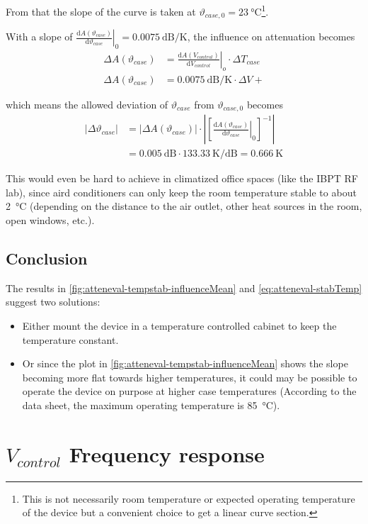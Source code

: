 






From that the slope of the curve is taken at $\vartheta_{case,0}=\SI{23}{\degreeCelsius}$\footnote{This is not necessarily room temperature or expected operating temperature of the device but a convenient choice to get a linear curve section.}.

With a slope of $\left.\frac{\text{d}A(\vartheta_{case})}{\text{d}\vartheta_{case}}\right|_{0} = \SI{0.0075}{\dB\per\kelvin}$, the influence on attenuation becomes
\begin{align}
\Delta A(\vartheta_{case}) &= \left.\frac{\text{d}A(V_{control})}{\text{d}V_{control}}\right|_{o} \cdot \Delta T_{case} \\
\Delta A(\vartheta_{case}) &= \SI{0.0075}{\dB\per\kelvin} \cdot \Delta V+
\end{align}

which means the allowed deviation of $\vartheta_{case}$ from $\vartheta_{case,0}$ becomes
\begin{align}\label{eq:atteneval-stabTemp}
\left|\Delta \vartheta_{case}\right| &= \left|\Delta A(\vartheta_{case})\right| \cdot 
\left|\left[\left.\frac{\text{d}A(\vartheta_{case})}{\text{d}\vartheta_{case}}\right|_{0}\right]^{-1}\right| \\
 &= \SI{0.005}{\dB} \cdot \SI{133.33}{\kelvin\per\dB} = \SI{0.666}{\kelvin}
\end{align}

This would even be hard to achieve in climatized office spaces (like the IBPT RF lab), since aird conditioners can only keep the room temperature stable to about \SI{2}{\degreeCelsius} (depending on the distance to the air outlet, other heat sources in the room, open windows, etc.).

\FloatBarrier
\subsection{Conclusion}
The results in \autoref{fig:atteneval-tempstab-influenceMean} and \autoref{eq:atteneval-stabTemp} suggest two solutions:
\begin{itemize}
\item Either mount the device in a temperature controlled cabinet to keep the temperature constant.
\item Or since the plot in \autoref{fig:atteneval-tempstab-influenceMean} shows the slope becoming more flat towards higher temperatures, it could may be possible to operate the device on purpose at higher case temperatures (According to the data sheet\cite{mini-circuitsZX732500VoltageVariable}, the maximum operating temperature is \SI{85}{\degreeCelsius}).
\end{itemize}

\FloatBarrier
\newpage
\section{$V_{control}$ Frequency response}


